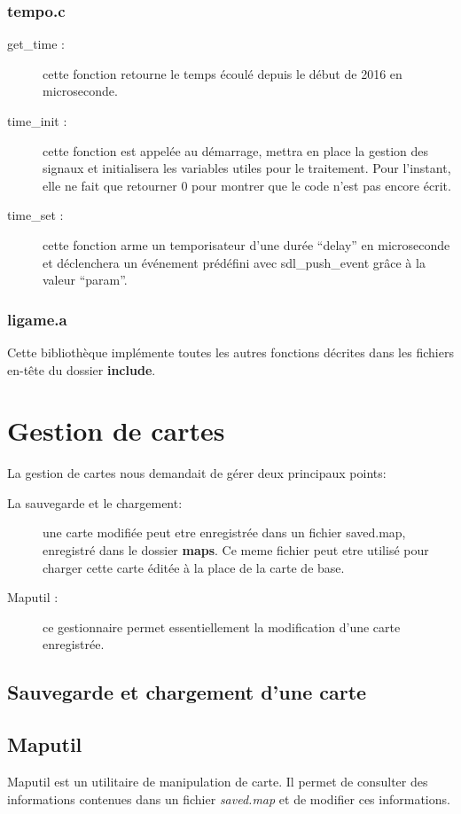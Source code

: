 \documentclass{report}
\begin{document}
\subsection{tempo.c}
\begin{description}
\item[get\_time :] cette fonction retourne le temps écoulé depuis le début de 2016 en microseconde.
\item[time\_init :] cette fonction est appelée au démarrage, mettra en place la gestion des signaux et initialisera les variables utiles pour le traitement. Pour l'instant, elle ne fait que retourner 0 pour montrer que le code n'est pas encore écrit.
\item[time\_set :] cette fonction arme un temporisateur d'une durée ``delay'' en microseconde et déclenchera un événement prédéfini avec sdl\_push\_event grâce à la valeur ``param''.
\end{description}

\subsection{ligame.a}
Cette bibliothèque implémente toutes les autres fonctions décrites dans les fichiers en-tête du dossier \textbf{include}.


\chapter{Gestion de cartes}
\setcounter{section}{0}
La gestion de cartes nous demandait de gérer deux principaux points:
\begin{description}
\item[La sauvegarde et le chargement:] une carte modifiée peut etre enregistrée dans un fichier saved.map, enregistré dans le dossier \textbf{maps}. Ce meme fichier peut etre utilisé pour charger cette carte éditée à la place de la carte de base.
\item[Maputil :] ce gestionnaire permet essentiellement la modification d'une carte enregistrée.
\end{description}

\section{Sauvegarde et chargement d'une carte}

\section{Maputil}
Maputil est un utilitaire de manipulation de carte. Il permet de consulter des informations contenues dans un fichier \textit{saved.map} et de modifier ces informations.
\end{document}
